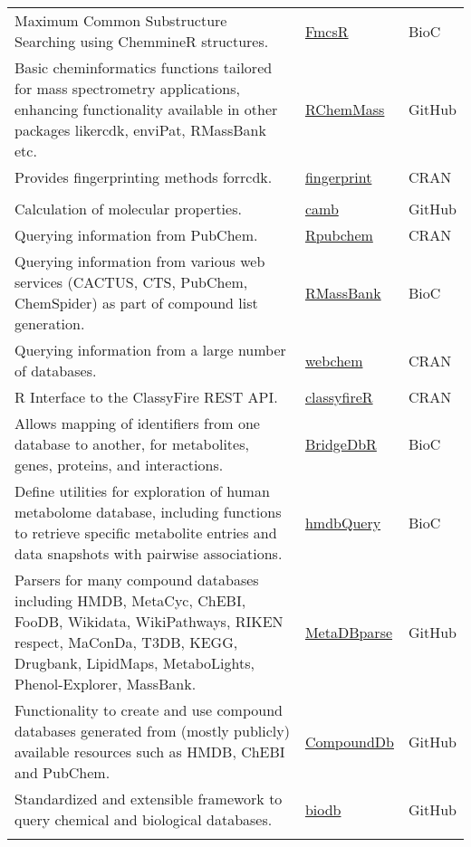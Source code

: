 \documentclass[]{article}
\begin{document}
\begin{longtable}{>{\raggedright\arraybackslash}p{30em}>{\raggedright\arraybackslash}p{10em}>{\raggedright\arraybackslash}p{3em}}
Maximum Common Substructure Searching using ChemmineR structures. & \href{https://doi.org/doi:10.18129/B9.bioc.fmcsR}{FmcsR} & BioC\\
\rowcolor{gray!6}  Basic cheminformatics functions tailored for mass spectrometry applications, enhancing functionality available in other packages likercdk, enviPat, RMassBank etc. & \href{https://github.com/schymane/RChemMass}{RChemMass} & GitHub\\
Provides fingerprinting methods forrcdk. & \href{https://cran.r-project.org/package=fingerprint}{fingerprint} & CRAN\\
\rowcolor{gray!6}  \addlinespace[0.3em]
\multicolumn{3}{l}{\textbf{Database queries}}\\
Calculation of molecular properties. & \href{https://github.com/cambDI/camb}{camb} & GitHub\\
Querying information from PubChem. & \href{https://cran.r-project.org/package=rpubchem}{Rpubchem} & CRAN\\
\rowcolor{gray!6}  Querying information from various web services (CACTUS, CTS, PubChem, ChemSpider) as part of compound list generation. & \href{https://doi.org/doi:10.18129/B9.bioc.RMassBank}{RMassBank} & BioC\\
Querying information from a large number of databases. & \href{https://cran.r-project.org/package=webchem}{webchem} & CRAN\\
\rowcolor{gray!6}  R Interface to the ClassyFire REST API. & \href{https://cran.r-project.org/web/packages/classyfireR/index.html}{classyfireR} & CRAN\\
Allows mapping of identifiers from one database to another, for metabolites, genes, proteins, and interactions. & \href{https://doi.org/10.18129/B9.bioc.BridgeDbR}{BridgeDbR} & BioC\\
\rowcolor{gray!6}  Define utilities for exploration of human metabolome database, including functions to retrieve specific metabolite entries and data snapshots with pairwise associations. & \href{https://doi.org/doi:10.18129/B9.bioc.hmdbQuery}{hmdbQuery} & BioC\\
Parsers for many compound databases including HMDB, MetaCyc, ChEBI, FooDB, Wikidata, WikiPathways, RIKEN respect, MaConDa, T3DB, KEGG, Drugbank, LipidMaps, MetaboLights, Phenol-Explorer, MassBank. & \href{https://github.com/UMCUGenetics/MetaDBparse}{MetaDBparse} & GitHub\\
\rowcolor{gray!6}  Functionality to create and use compound databases generated from (mostly publicly) available resources such as HMDB, ChEBI and PubChem. & \href{https://github.com/EuracBiomedicalResearch/CompoundDb}{CompoundDb} & GitHub\\
Standardized and extensible framework to query chemical and biological databases. & \href{https://github.com/pkrog/biodb}{biodb} & GitHub\\*
\end{longtable}
\end{document}
